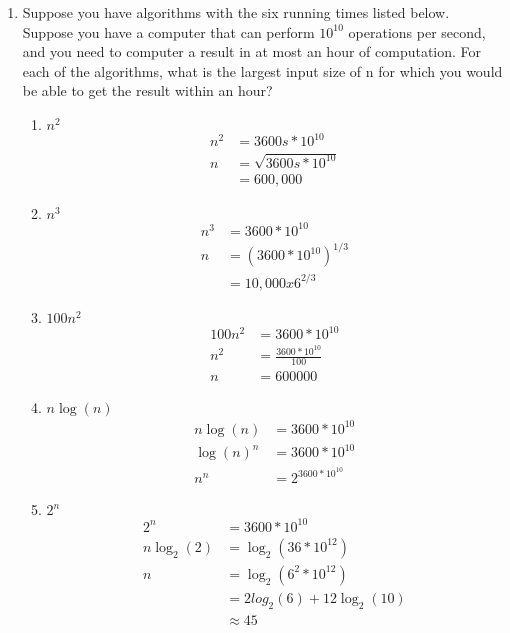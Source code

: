 \documentclass[12pt]{article}
\begin{document}
\begin{enumerate}
\begin{enumerate}
\begin{enumerate}
		\end{enumerate}
	\end{enumerate}
\item Suppose you have algorithms with the six running times listed below. Suppose you have a computer that can perform $10^{10}$ operations per second, and you need to computer a result in at most an hour of computation. For each of the algorithms, what is the largest input size of n for which you would be able to get the result within an hour?
	\begin{enumerate}
	\item $n^2$\\
	\begin{align*}
	n^2 &= 3600s*10^{10}\\
	n &= \sqrt{3600s*10^{10}}\\
	&= 600,000
	\end{align*}
	
	\item $n^3$\\
	\begin{align*}
	n^3 &= 3600*10^{10}\\
	n &= (3600*10^{10})^{1/3}\\
	&= 10,000x6^{2/3}
	\end{align*}

	\item $100n^2$\\
	\begin{align*}
	100n^2 &= 3600*10^{10}\\
	n^2 &= \frac{3600*10^{10}}{100}\\
	n &= 600000
	\end{align*}

	\item $n \log(n)$\\
	\begin{align*}
	n \log(n) &= 3600*10^{10}\\
	\log(n)^n &= 3600*10^{10}\\
	n^n &= 2^{3600*10^{10}}
	\end{align*}

	\item $2^n$\\
	\begin{align*}
	2^n &= 3600*10^{10}\\
	n\log_2(2) &= \log_2(36*10^{12})\\
	n &= \log_2(6^2*10^{12})\\
	&= 2log_2(6)+12\log_2(10)\\
	&\approx 45
	\end{align*}


\end{enumerate}
\end{enumerate}
\end{document}
